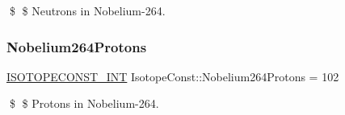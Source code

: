 \$ \$ Neutrons in Nobelium-\/264. \mbox{\label{group___isotope_const-_nobelium-_no264_gad1df31d779853e6d44f3ae8b3181e58a}} 
\subsubsection{\texorpdfstring{Nobelium264\+Protons}{Nobelium264Protons}}
{\footnotesize\ttfamily \mbox{\hyperlink{group___isotope_const-_macros_ga5f18360b3e99483a35c32d789e62621c}{I\+S\+O\+T\+O\+P\+E\+C\+O\+N\+S\+T\+\_\+\+I\+NT}} Isotope\+Const\+::\+Nobelium264\+Protons = 102}

\$ \$ Protons in Nobelium-\/264. 